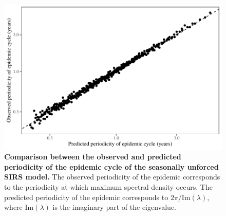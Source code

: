 \documentclass[12pt]{article}
\begin{document}
\begin{figure}[!th]
\begin{center}
\includegraphics[width=\textwidth]{../figure6/figure_persistence_noise_period.pdf}
\caption{
\textbf{Comparison between the observed and predicted periodicity of the epidemic cycle of the seasonally unforced SIRS model.}
The observed periodicity of the epidemic corresponds to the periodicity at which maximum spectral density occurs.
The predicted periodicity of the epidemic corresponds to $2 \pi/\mathrm{Im}(\lambda)$, where $\mathrm{Im}(\lambda)$ is the imaginary part of the eigenvalue.
}
\end{center}
\end{figure}

\pagebreak
\end{document}
